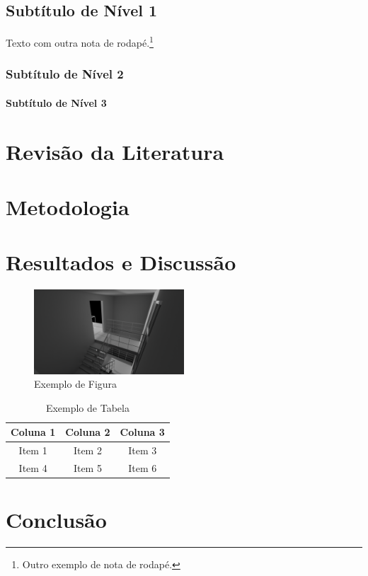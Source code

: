 \documentclass[12pt,a4paper,oneside,brazil]{abntex2}
\begin{document}
\section{Subtítulo de Nível 1}
Texto com outra nota de rodapé.\footnote{Outro exemplo de nota de rodapé.} \lipsum[2-3]

\subsection{Subtítulo de Nível 2}
\lipsum[4]
\subsubsection{Subtítulo de Nível 3}
\lipsum[5]
\lipsum[5]

\chapter{Revisão da Literatura}
\lipsum[6-7]

\chapter{Metodologia}
\lipsum[8-9]

\chapter{Resultados e Discussão}
\lipsum[10]

\begin{figure}[ht]
\centering
\includegraphics[width=0.5\textwidth]{./src/assets/untitled.png}
\caption{Exemplo de Figura}
\label{fig:exemplo}
\end{figure}

\begin{table}[ht]
\centering
\begin{tabular}{|c|c|c|}
\hline
Coluna 1 & Coluna 2 & Coluna 3 \\ \hline
Item 1   & Item 2   & Item 3   \\ \hline
Item 4   & Item 5   & Item 6   \\ \hline
\end{tabular}
\caption{Exemplo de Tabela}
\label{tab:exemplo}
\end{table}

\chapter{Conclusão}
\lipsum[11-12]


\end{document}
